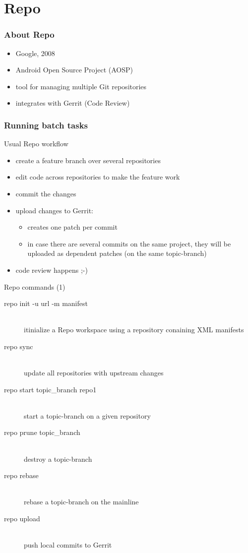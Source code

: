 \documentclass{beamer}
\begin{document}
\section{Repo}
\begin{frame}
  \frametitle{About Repo}
  
  \begin{itemize}[<+->]
    \item Google, 2008
    \item Android Open Source Project (AOSP)
    \item tool for managing multiple Git repositories
    \item integrates with Gerrit (Code Review)
  \end{itemize}
\end{frame}

\begin{frame}
  \frametitle{Running batch tasks}

  Usual Repo workflow
  \pause
  \begin{itemize}[<+->]
    \item create a feature branch over several repositories
    \item edit code across repositories to make the feature work
    \item commit the changes
    \item upload changes to Gerrit:
      \begin{itemize}
        \item creates one patch per commit
        \item in case there are several commits on the same project, they will be
          uploaded as dependent patches (on the same topic-branch)
      \end{itemize}
    \item code review happens ;-)
  \end{itemize}
\end{frame}

\begin{frame}{Repo commands (1)}
  \begin{description}
    \item[repo init -u url -m manifest] \hfill \\
      itinialize a Repo workspace using a repository conaining XML manifests
    \item[repo sync] \hfill \\
      update all repositories with upstream changes
    \item[repo start topic\_branch repo1] \hfill \\
      start a topic-branch on a given repository
    \item[repo prune topic\_branch] \hfill \\
      destroy a topic-branch
    \item[repo rebase] \hfill \\
      rebase a topic-branch on the mainline
    \item[repo upload] \hfill \\
      push local commits to Gerrit
  \end{description}
\end{frame}
\end{document}
